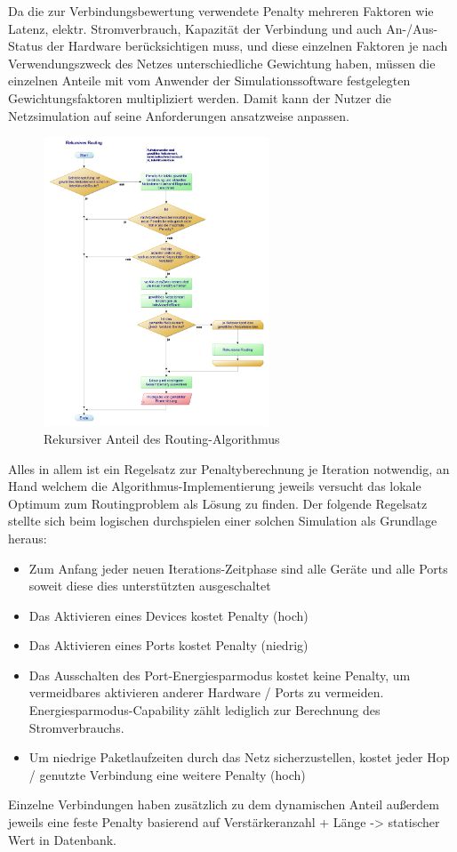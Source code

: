 \documentclass[12pt,titlepage]{article}
\begin{document}
Da die zur Verbindungsbewertung verwendete Penalty mehreren Faktoren wie Latenz, elektr. Stromverbrauch, Kapazität der Verbindung und auch An-/Aus-Status der Hardware berücksichtigen muss, und diese einzelnen Faktoren je nach Verwendungszweck des Netzes unterschiedliche Gewichtung haben, müssen die einzelnen Anteile mit vom Anwender der Simulationssoftware festgelegten Gewichtungsfaktoren multipliziert werden. Damit kann der Nutzer die Netzsimulation auf seine Anforderungen ansatzweise anpassen.
\begin{figure}[!h]
	\centering
	\includegraphics[width=0.6\textwidth]{3Rekursives_Routing}
	\caption{Rekursiver Anteil des Routing-Algorithmus}
	\label{fig:3Rekursives_Routing}
\end{figure}


Alles in allem ist ein Regelsatz zur Penaltyberechnung je Iteration notwendig, an Hand welchem die Algorithmus-Implementierung jeweils versucht das lokale Optimum zum Routingproblem als Lösung zu finden.
Der folgende Regelsatz stellte sich beim logischen durchspielen einer solchen Simulation als Grundlage heraus:
\begin{itemize}
	\item Zum Anfang jeder neuen Iterations-Zeitphase sind alle Geräte und alle Ports soweit diese dies unterstützten ausgeschaltet
	\item Das Aktivieren eines Devices kostet Penalty (hoch)
	\item Das Aktivieren eines Ports kostet Penalty (niedrig)
	\item Das Ausschalten des Port-Energiesparmodus kostet keine Penalty, um vermeidbares aktivieren anderer Hardware / Ports zu vermeiden. Energiesparmodus-Capability zählt lediglich zur Berechnung des Stromverbrauchs.
	\item Um niedrige Paketlaufzeiten durch das Netz sicherzustellen, kostet jeder Hop / genutzte Verbindung eine weitere Penalty (hoch)
\end{itemize}
Einzelne Verbindungen haben zusätzlich zu dem dynamischen Anteil außerdem jeweils eine feste Penalty basierend auf Verstärkeranzahl + Länge -> statischer Wert in Datenbank.
\end{document}
